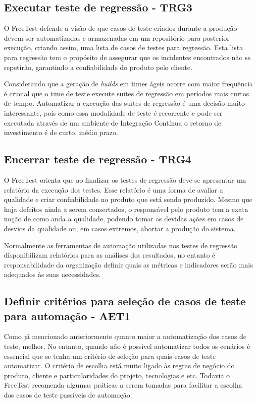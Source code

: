 \subsection{Executar teste de regressão - TRG3}
\label{sec:guiatrg3}

O FreeTest defende a visão de que casos de teste criados durante a produção devem ser automatizadas e armazenadas em um repositório para posterior execução, criando assim, uma lista de casos de testes para regressão. Esta lista para regressão tem o propósito de assegurar que os incidentes encontrados não se repetirão, garantindo a confiabilidade do produto pelo cliente.

Considerando que a geração de \textit{builds} em times ágeis ocorre com maior frequência é crucial que o time de teste execute suítes de regressão em períodos mais curtos de tempo. Automatizar a execução das suítes de regressão é uma decisão muito interessante, pois como essa modalidade de teste é recorrente e pode ser executada através de um ambiente de Integração Contínua o retorno de investimento é de curto, médio prazo.

	
\subsection{Encerrar teste de regressão - TRG4}
\label{sec:guiatrg4}

O FreeTest orienta que ao finalizar os testes de regressão deve-se apresentar um relatório da execução dos testes. Esse relatório é uma forma de avaliar a qualidade e criar confiabilidade no produto que está sendo produzido. Mesmo que haja defeitos ainda a serem consertados, o responsável pelo produto tem a exata noção de como anda a qualidade, podendo tomar as devidas ações em casos de desvios da qualidade ou, em casos extremos, abortar a produção do sistema.

Normalmente as ferramentas de automação utilizadas nos testes de regressão disponibilizam relatórios para as análises dos resultados, no entanto é responsabilidade da organização definir quais as métricas e indicadores serão mais adequados às suas necessidades.


\subsection{Definir critérios para seleção de casos de teste para automação - AET1}
\label{sec:guiaaet1}

Como já mencionado anteriormente quanto maior a automatização dos casos de teste, melhor. No entanto, quando não é possível automatizar todos os cenários é essencial que se tenha um critério de seleção para quais casos de teste automatizar. O critério de escolha está muito ligado às regras de negócio do produto, cliente e particularidades do projeto, tecnologias e etc. Todavia o FreeTest recomenda algumas práticas a serem tomadas para facilitar a escolha dos casos de teste passíveis de automação.


